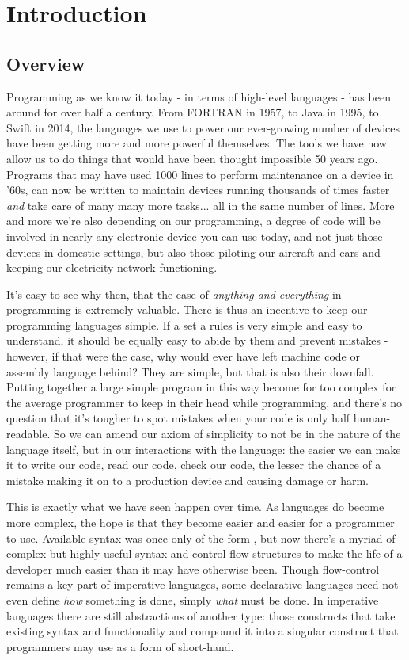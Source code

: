 \documentclass{article}
\begin{document}

\section{Introduction}
    \subsection{Overview}
    \label{sec:overview}
        Programming as we know it today - in terms of high-level languages - has been around for over half a century. From FORTRAN in 1957, to Java in 1995, to Swift in 2014, the languages we use to power our ever-growing number of devices have been getting more and more powerful themselves. The tools we have now allow us to do things that would have been thought impossible 50 years ago. Programs that may have used 1000 lines to perform maintenance on a device in '60s, can now be written to maintain devices running thousands of times faster \emph{and} take care of many many more tasks... all in the same number of lines. More and more we're also depending on our programming, a degree of code will be involved in nearly any electronic device you can use today, and not just those devices in domestic settings, but also those piloting our aircraft and cars and keeping our electricity network functioning.

        It's easy to see why then, that the ease of \emph{anything and everything} in programming is extremely valuable. There is thus an incentive to keep our programming languages simple. If a set a rules is very simple and easy to understand, it should be equally easy to abide by them and prevent mistakes - however, if that were the case, why would ever have left machine code or assembly language behind? They are simple, but that is also their downfall. Putting together a large simple program in this way become for too complex for the average programmer to keep in their head while programming, and there's no question that it's tougher to spot mistakes when your code is only half human-readable. So we can amend our axiom of simplicity to not be in the nature of the language itself, but in our interactions with the language: the easier we can make it to write our code, read our code, check our code, the lesser the chance of a mistake making it on to a production device and causing damage or harm. 

        This is exactly what we have seen happen over time. As languages do become more complex, the hope is that they become easier and easier for a programmer to use. Available syntax was once only of the form , but now there's a myriad of complex but highly useful syntax and control flow structures to make the life of a developer much easier than it may have otherwise been. Though flow-control remains a key part of imperative languages, some declarative languages need not even define \emph{how} something is done, simply \emph{what} must be done. In imperative languages there are still abstractions of another type: those constructs that take existing syntax and functionality and compound it into a singular construct that programmers may use as a form of short-hand. 
        
\end{document}
